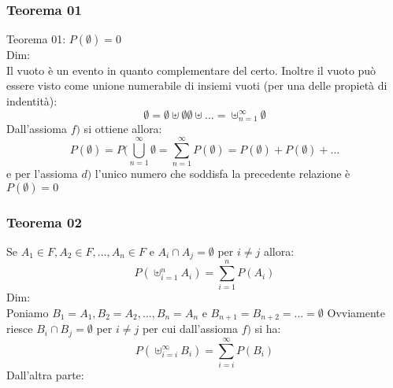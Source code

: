 \subsubsection{Teorema 01}
Teorema 01: $ P(\emptyset) = 0 $\\
Dim:\\
Il vuoto è un evento in quanto complementare del certo. Inoltre il vuoto può essere visto come unione numerabile di insiemi vuoti (per una delle propietà di indentità):
$$ \emptyset = \emptyset \uplus \emptyset \emptyset \uplus ... = \uplus_{n=1}^{\infty} \emptyset $$
Dall'assioma $f)$ si ottiene allora:
$$ P(\emptyset) = P(\bigcup_{n=1}^{\infty} \emptyset = \sum_{n=1}^{\infty} P(\emptyset) = P(\emptyset) + P(\emptyset) + ...$$
e per l'assioma $d)$ l'unico numero che soddisfa la precedente relazione è $P(\emptyset)=0$
\subsubsection{Teorema 02}
Se $A_1 \in F, A_2 \in F, ..., A_n \in F$ e $A_i \cap A_j = \emptyset$ per $i \neq j$ allora:
$$ P(\uplus_{i=1}^n A_i) = \sum_{i=1}^n P(A_i)$$
Dim:\\
Poniamo $B_1 = A_1, B_2 = A_2,...,B_n = A_n$ e $B_{n+1} = B_{n+2} = ... = \emptyset$
Ovviamente riesce $B_i \cap B_j = \emptyset$ per $i \neq j$ per cui dall'assioma $f)$ si ha:
$$ P(\uplus_{i=i}^{\infty} B_i) = \sum_{i=i}^{\infty} P(B_i)$$
Dall'altra parte:



